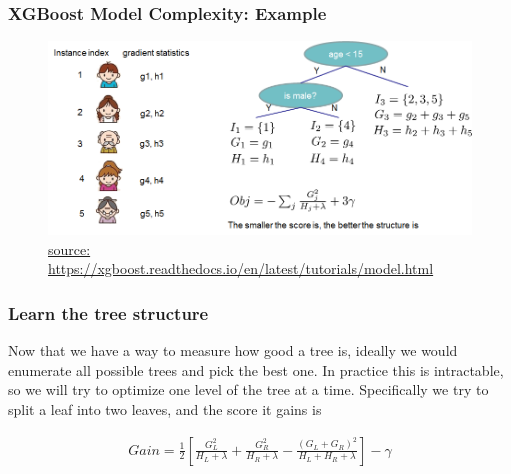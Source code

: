\documentclass[
  shownotes,
  xcolor={svgnames},
  hyperref={colorlinks,citecolor=DarkBlue,linkcolor=DarkRed,urlcolor=DarkBlue}
  , aspectratio=169]{beamer}
\begin{document}
\begin{frame}[fragile]
\frametitle{XGBoost Model Complexity: Example}
  \begin{figure}[H] \centering
            \captionsetup{justification=centering}
              \includegraphics[scale=0.6]{figures/struct_score}
              \\
              \tiny
              \url{source: https://xgboost.readthedocs.io/en/latest/tutorials/model.html}
 \end{figure}

 \end{frame}
\begin{frame}[fragile]
\frametitle{Learn the tree structure}



Now that we have a way to measure how good a tree is, ideally we would enumerate all possible trees and pick the best one. In practice this is intractable, so we will try to optimize one level of the tree at a time. Specifically we try to split a leaf into two leaves, and the score it gains is

\begin{align}
Gain = \frac{1}{2} \left[\frac{G_L^2}{H_L+\lambda}+\frac{G_R^2}{H_R+\lambda}-\frac{(G_L+G_R)^2}{H_L+H_R+\lambda}\right] - \gamma
\end{align}

 \end{frame}
\end{document}
